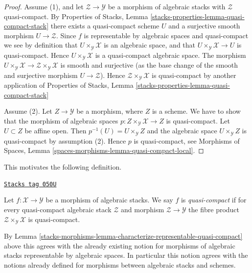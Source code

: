 \begin{proof}
Assume (1), and let $\mathcal{Z} \to \mathcal{Y}$
be a morphism of algebraic stacks with $\mathcal{Z}$ quasi-compact. By
Properties of Stacks,
Lemma \ref{stacks-properties-lemma-quasi-compact-stack}
there exists a quasi-compact scheme $U$ and a surjective smooth
morphism $U \to \mathcal{Z}$. Since $f$ is representable by algebraic
spaces and quasi-compact we see by definition that
$U \times_\mathcal{Y} \mathcal{X}$ is an algebraic space, and that
$U \times_\mathcal{Y} \mathcal{X} \to U$ is quasi-compact.
Hence $U \times_\mathcal{Y} \mathcal{X}$ is a quasi-compact algebraic space.
The morphism
$U \times_\mathcal{Y} \mathcal{X} \to
\mathcal{Z} \times_\mathcal{Y} \mathcal{X}$
is smooth and surjective (as the base change of the smooth
and surjective morphism $U \to \mathcal{Z}$).
Hence $\mathcal{Z} \times_\mathcal{Y} \mathcal{X}$
is quasi-compact by another application of
Properties of Stacks,
Lemma \ref{stacks-properties-lemma-quasi-compact-stack}

\medskip\noindent
Assume (2). Let $Z \to \mathcal{Y}$ be a morphism, where $Z$ is a scheme.
We have to show that the morphism of algebraic spaces
$p : Z \times_\mathcal{Y} \mathcal{X} \to Z$ is quasi-compact.
Let $U \subset Z$ be affine open. Then
$p^{-1}(U) = U \times_\mathcal{Y} Z$
and the algebraic space $U \times_\mathcal{Y} Z$
is quasi-compact by assumption (2). Hence $p$ is quasi-compact, see
Morphisms of Spaces, Lemma \ref{spaces-morphisms-lemma-quasi-compact-local}.
\end{proof}

This motivates the following definition.

\begin{definition}
\label{stacks-morphisms-definition-quasi-compact}
\href{https://stacks.math.columbia.edu/tag/050U}{\texttt{Stacks tag 050U}}

Let $f : \mathcal{X} \to \mathcal{Y}$ be a morphism of algebraic stacks.
We say $f$ is {\it quasi-compact} if for every quasi-compact
algebraic stack $\mathcal{Z}$ and morphism $\mathcal{Z} \to \mathcal{Y}$
the fibre product $\mathcal{Z} \times_\mathcal{Y} \mathcal{X}$
is quasi-compact.
\end{definition}

By
Lemma \ref{stacks-morphisms-lemma-characterize-representable-quasi-compact}
above this agrees with the already existing notion
for morphisms of algebraic stacks representable by algebraic spaces.
In particular this notion agrees with the notions already defined
for morphisms between algebraic stacks and schemes.

